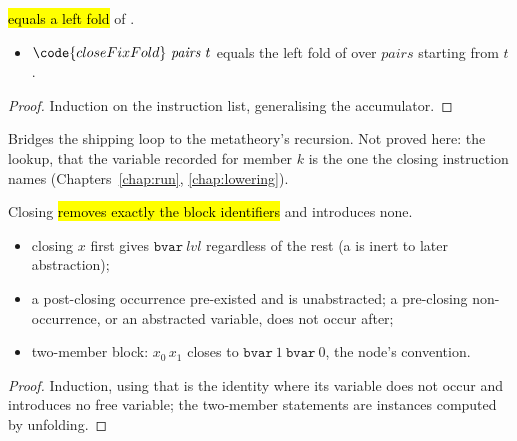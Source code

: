 \begin{lemma}
\label{lem:closeFixFold_eq_foldl}
\leanok
{}
  \hl{equals a left fold} of .
\begin{itemize}
\item {} $\code{closeFixFold}\ \mathit{pairs}\ t$ equals the left fold of  over
$\mathit{pairs}$ starting from $t$.
\end{itemize}
\end{lemma}
\begin{proof}
\leanok
{}
 Induction on the instruction list, generalising the accumulator.
\end{proof}

\begin{remark}
 Bridges the shipping loop to the metatheory's recursion. Not proved here: the
 lookup, that the variable recorded for member $k$ is the one the closing instruction
names (Chapters~\ref{chap:run}, \ref{chap:lowering}).
\end{remark}

\begin{lemma}
\label{lem:closeFixFold_fvar_head}
\leanok
{}
 Closing \hl{removes exactly the block identifiers} and introduces none.
\begin{itemize}
\item closing $x$ first gives $\mathtt{bvar}\ \mathit{lvl}$ regardless of the rest (a  is inert
to later abstraction);
\item a post-closing occurrence pre-existed and is unabstracted; a pre-closing non-occurrence, or an
abstracted variable, does not occur after;
\item two-member block: $x_0\,x_1$ closes to $\mathtt{bvar}\ 1\ \mathtt{bvar}\ 0$, the  node's
convention.
\end{itemize}
\end{lemma}
\begin{proof}
\leanok
{}
 Induction, using that  is the identity where its variable does not occur and
introduces no free variable; the two-member statements are instances computed by unfolding.
\end{proof}


